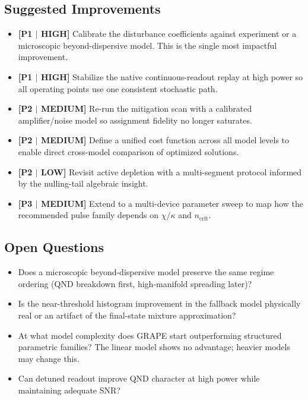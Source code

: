 \documentclass[aps,pra,twocolumn,reprint,amsmath,amssymb]{revtex4-2}
\begin{document}
\subsection{Suggested Improvements}

\begin{itemize}
\item \textbf{[P1 $|$ HIGH]} Calibrate the disturbance coefficients against experiment or a microscopic beyond-dispersive model. This is the single most impactful improvement.
\item \textbf{[P1 $|$ HIGH]} Stabilize the native continuous-readout replay at high power so all operating points use one consistent stochastic path.
\item \textbf{[P2 $|$ MEDIUM]} Re-run the mitigation scan with a calibrated amplifier/noise model so assignment fidelity no longer saturates.
\item \textbf{[P2 $|$ MEDIUM]} Define a unified cost function across all model levels to enable direct cross-model comparison of optimized solutions.
\item \textbf{[P2 $|$ LOW]} Revisit active depletion with a multi-segment protocol informed by the nulling-tail algebraic insight.
\item \textbf{[P3 $|$ MEDIUM]} Extend to a multi-device parameter sweep to map how the recommended pulse family depends on $\chi/\kappa$ and $n_\mathrm{crit}$.
\end{itemize}

\subsection{Open Questions}

\begin{itemize}
\item Does a microscopic beyond-dispersive model preserve the same regime ordering (QND breakdown first, high-manifold spreading later)?
\item Is the near-threshold histogram improvement in the fallback model physically real or an artifact of the final-state mixture approximation?
\item At what model complexity does GRAPE start outperforming structured parametric families? The linear model shows no advantage; heavier models may change this.
\item Can detuned readout improve QND character at high power while maintaining adequate SNR?
\end{itemize}



\end{document}
